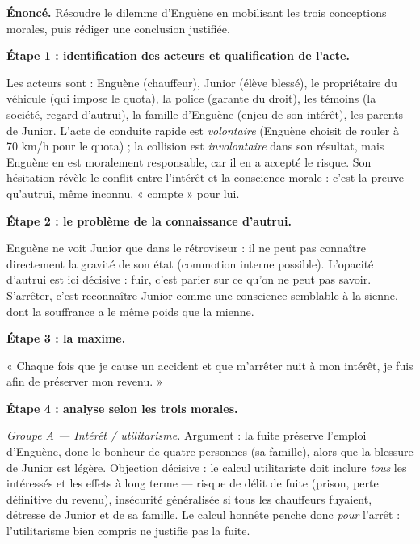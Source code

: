 \documentclass[11pt]{article}
\newcounter{popsec}
\newcounter{popsub}
\newcommand{\courssub}[1]{%
  \stepcounter{popsub}%
  \par\vspace{9pt}\noindent{\popxbold\fontsize{11.5}{13}\selectfont\color{popink}{\color{poporange}\thepopsec.\thepopsub}\hspace{6pt}#1}\par\nopagebreak\vspace{4pt}
}
\begin{document}
\courssub{Démarche et corrigé commenté}

\begin{exoresolu}
\textbf{Énoncé.} Résoudre le dilemme d'Enguène en mobilisant les trois conceptions morales, puis rédiger une conclusion justifiée.

\tcblower

\textbf{Étape 1 : identification des acteurs et qualification de l'acte.}

Les acteurs sont : Enguène (chauffeur), Junior (élève blessé), le propriétaire du véhicule (qui impose le quota), la police (garante du droit), les témoins (la société, regard d'autrui), la famille d'Enguène (enjeu de son intérêt), les parents de Junior. L'acte de conduite rapide est \emph{volontaire} (Enguène choisit de rouler à 70 km/h pour le quota) ; la collision est \emph{involontaire} dans son résultat, mais Enguène en est moralement responsable, car il en a accepté le risque. Son hésitation révèle le conflit entre l'intérêt et la conscience morale : c'est la preuve qu'autrui, même inconnu, « compte » pour lui.

\textbf{Étape 2 : le problème de la connaissance d'autrui.}

Enguène ne voit Junior que dans le rétroviseur : il ne peut pas connaître directement la gravité de son état (commotion interne possible). L'opacité d'autrui est ici décisive : fuir, c'est parier sur ce qu'on ne peut pas savoir. S'arrêter, c'est reconnaître Junior comme une conscience semblable à la sienne, dont la souffrance a le même poids que la mienne.

\textbf{Étape 3 : la maxime.}

« Chaque fois que je cause un accident et que m'arrêter nuit à mon intérêt, je fuis afin de préserver mon revenu. »

\textbf{Étape 4 : analyse selon les trois morales.}

\emph{Groupe A — Intérêt / utilitarisme.} Argument : la fuite préserve l'emploi d'Enguène, donc le bonheur de quatre personnes (sa famille), alors que la blessure de Junior est légère. Objection décisive : le calcul utilitariste doit inclure \emph{tous} les intéressés et les effets à long terme — risque de délit de fuite (prison, perte définitive du revenu), insécurité généralisée si tous les chauffeurs fuyaient, détresse de Junior et de sa famille. Le calcul honnête penche donc \emph{pour} l'arrêt : l'utilitarisme bien compris ne justifie pas la fuite.


\end{exoresolu}
\end{document}
